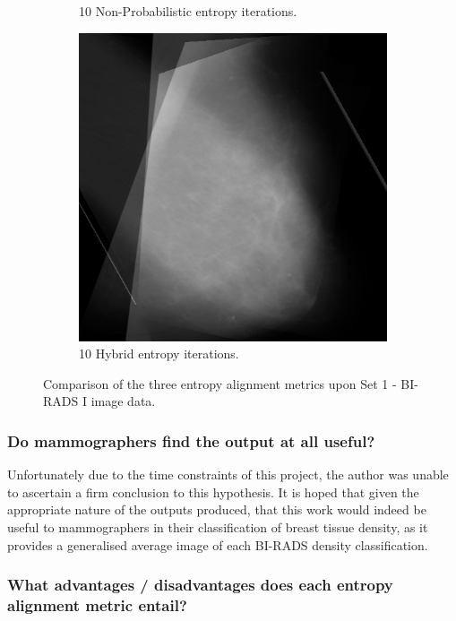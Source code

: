\begin{figure}[H]
\begin{subfigure}[t]{0.3\textwidth}
        \caption{10 Non-Probabilistic entropy iterations.}
        \label{fig:nonProb-comp}
    \end{subfigure} \hfill
    \begin{subfigure}[t]{0.3\textwidth}
      \includegraphics[width=\textwidth]{Chapter3/hybrid-img/hybrid-10.png}
      \caption{10 Hybrid entropy iterations.}
      \label{fig:hybrid-comp}
    \end{subfigure}
    \caption{Comparison of the three entropy alignment metrics upon Set 1 - BI-RADS I image data.}
    \label{fig:comparison-of-techniques}
\end{figure}

\subsubsection{Do mammographers find the output at all useful?}

Unfortunately due to the time constraints of this project, the author was unable to ascertain a firm conclusion to this hypothesis. It is hoped that given the appropriate nature of the outputs produced, that this work would indeed be useful to mammographers in their classification of breast tissue density, as it provides a generalised average image of each BI-RADS density classification.

\subsubsection{What advantages / disadvantages does each entropy alignment metric entail?}

